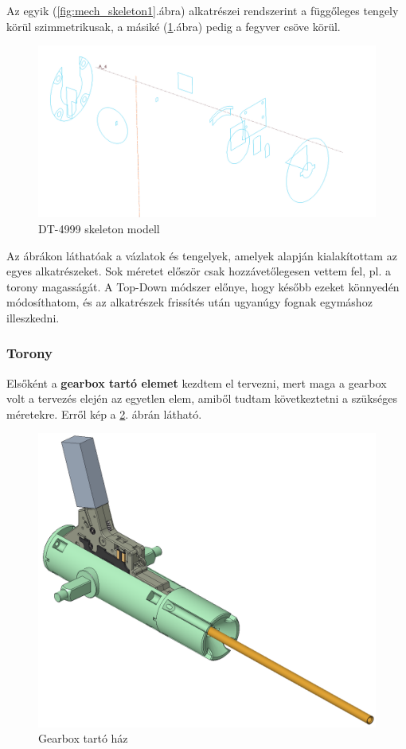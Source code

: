 \documentclass[12pt,a4paper]{article}
\begin{document}
Az egyik (\ref{fig:mech_skeleton1}.ábra) alkatrészei rendszerint a függőleges tengely körül szimmetrikusak, a másiké (\ref{fig:mech_skeleton2}.ábra) pedig a fegyver csöve körül.

\begin{figure}[h!]
	\centering
	\includegraphics[width=1\linewidth]{mech_skeleton2}
	\caption{DT-4999 skeleton modell}
	\label{fig:mech_skeleton2}
\end{figure}

Az ábrákon láthatóak a vázlatok és tengelyek, amelyek alapján kialakítottam az egyes alkatrészeket. Sok méretet először csak hozzávetőlegesen vettem fel, pl. a torony magasságát. A Top-Down módszer előnye, hogy később ezeket könnyedén módosíthatom, és az alkatrészek frissítés után ugyanúgy fognak egymáshoz illeszkedni.

\pagebreak

\subsubsection{Torony}

Elsőként a \textbf{gearbox tartó elemet} kezdtem el tervezni, mert maga a gearbox volt a tervezés elején az egyetlen elem, amiből tudtam következtetni a szükséges méretekre. Erről kép a \ref{fig:mech_dt4000}. ábrán látható. 

\begin{figure}[h!]
	\centering
	\includegraphics[width=0.8\linewidth]{mech_dt4000}
	\caption{Gearbox tartó ház}
	\label{fig:mech_dt4000}
\end{figure}
\end{document}
